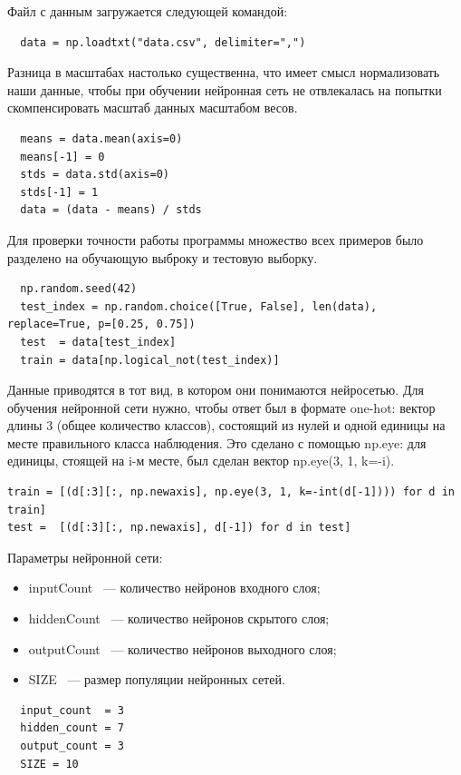 Файл с данным загружается следующей командой:

\begin{lstlisting}
  data = np.loadtxt("data.csv", delimiter=",")
\end{lstlisting}

Разница в масштабах настолько существенна, что имеет смысл нормализовать наши данные, чтобы при обучении нейронная сеть не отвлекалась на попытки скомпенсировать масштаб данных масштабом весов.

\begin{lstlisting}
  means = data.mean(axis=0)
  means[-1] = 0 
  stds = data.std(axis=0)
  stds[-1] = 1
  data = (data - means) / stds
\end{lstlisting}

Для проверки точности работы программы множество всех примеров было разделено на обучающую выброку и тестовую выборку.

\begin{lstlisting}
  np.random.seed(42)
  test_index = np.random.choice([True, False], len(data), replace=True, p=[0.25, 0.75])
  test  = data[test_index]
  train = data[np.logical_not(test_index)]
\end{lstlisting}

Данные приводятся в тот вид, в котором они понимаются нейросетью. Для обучения нейронной сети нужно, чтобы ответ был в формате one-hot: вектор длины 3 (общее количество классов), состоящий из нулей и одной единицы на месте правильного класса наблюдения. Это сделано с помощью np.eye: для единицы, стоящей на i-м месте, был сделан вектор np.eye(3, 1, k=-i).

\begin{lstlisting}
train = [(d[:3][:, np.newaxis], np.eye(3, 1, k=-int(d[-1]))) for d in train]  
test =  [(d[:3][:, np.newaxis], d[-1]) for d in test]
\end{lstlisting}

Параметры нейронной сети:
\begin{itemize}
  \item inputCount ~--- количество нейронов входного слоя;
  \item hiddenCount ~--- количество нейронов скрытого слоя;
  \item outputCount ~--- количество нейронов выходного слоя;
  \item SIZE ~--- размер популяции нейронных сетей.
\end{itemize}

\begin{lstlisting}
  input_count  = 3 
  hidden_count = 7 
  output_count = 3   
  SIZE = 10 
\end{lstlisting}

